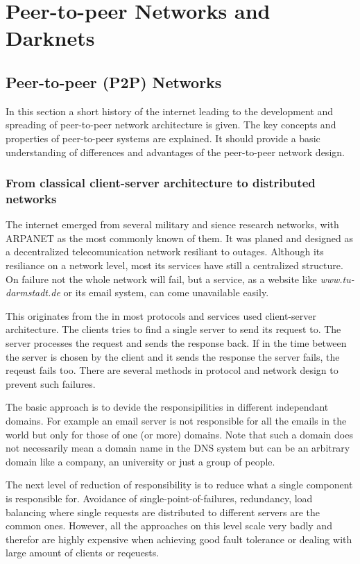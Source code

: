 \chapter{Peer-to-peer Networks and Darknets}


\section{Peer-to-peer (P2P) Networks}

In this section a short history of the internet leading to the development and spreading of peer-to-peer network architecture is given. The key concepts and properties of peer-to-peer systems are explained. It should provide a basic understanding of differences and advantages of the peer-to-peer network design.

\subsection{From classical client-server architecture to distributed networks}

The internet emerged from several military and sience research networks, with ARPANET as the most commonly known of them. It was planed and designed as a decentralized telecomunication network resiliant to outages. Although its resiliance on a network level, most its services have still a centralized structure. On failure not the whole network will fail, but a service, as a website like \emph{www.tu-darmstadt.de} or its email system, can come unavailable easily.

This originates from the in most protocols and services used client-server architecture. The clients tries to find a single server to send its request to. The server processes the request and sends the response back. If in the time between the server is chosen by the client and it sends the response the server fails, the reqeust fails too. There are several methods in protocol and network design to prevent such failures.

The basic approach is to devide the responsipilities in different independant domains. For example an email server is not responsible for all the emails in the world but only for those of one (or more) domains. Note that such a domain does not necessarily mean a domain name in the DNS system but can be an arbitrary domain like a company, an university or just a group of people.

The next level of reduction of responsibility is to reduce what a single component is responsible for. Avoidance of single-point-of-failures, redundancy, load balancing where single requests are distributed to different servers are the common ones. However, all the approaches on this level scale very badly and therefor are highly expensive when achieving good fault tolerance or dealing with large amount of clients or reqeuests.


